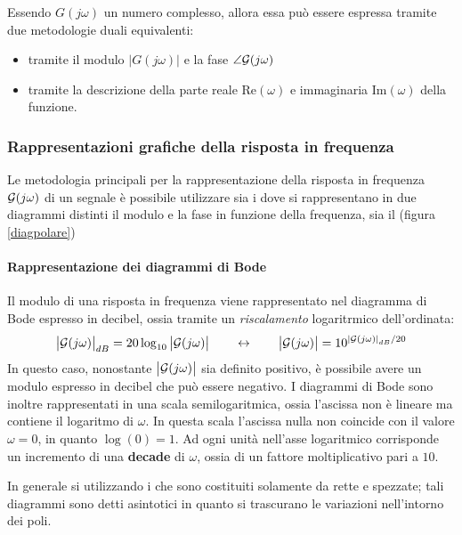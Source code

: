 		Essendo $G(j\omega)$ un numero complesso, allora essa può essere espressa tramite due metodologie duali equivalenti:
		\begin{itemize}
			\item tramite il modulo $|G(j\omega)|$ e la fase $\angle \mathcal G(j\omega)$ 
			\item tramite la descrizione della parte reale $\textrm{Re}(\omega)$ e immaginaria $\textrm{Im}(\omega)$ della funzione.
		\end{itemize}
	
		\subsubsection{Rappresentazioni grafiche della risposta in frequenza}
			Le metodologia principali per la rappresentazione della risposta in frequenza $\mathcal G(j\omega)$ di un segnale è possibile utilizzare sia i  dove si rappresentano in due diagrammi distinti il modulo e la fase in funzione della frequenza, sia il  (figura \ref{diagpolare})
			
			
			\paragraph{Rappresentazione dei diagrammi di Bode} Il modulo di una risposta in frequenza viene rappresentato nel diagramma di Bode espresso in decibel, ossia tramite un \textit{riscalamento} logaritrmico dell'ordinata:
			\[ \big| \mathcal G(j\omega) \big|_{dB} = 20 \log_{10}\big| \mathcal G(j\omega) \big| \qquad \leftrightarrow \qquad \big| \mathcal G(j\omega) \big| = 10^{\left| \mathcal G(j\omega) \right|_{dB} / 20 }\]
			In questo caso, nonostante $\big| \mathcal G(j\omega) \big|$ sia definito positivo, è possibile avere un modulo espresso in decibel che può essere negativo. I diagrammi di Bode sono inoltre rappresentati in una scala semilogaritmica, ossia l'ascissa non è lineare ma contiene il logaritmo di $\omega$. In questa scala l'ascissa nulla non coincide con il valore $\omega= 0$, in quanto $\log(0) = 1$. Ad ogni unità nell'asse logaritmico corrisponde un incremento di una \textbf{decade} di $\omega$, ossia di un fattore moltiplicativo pari a $10$.
			
			In generale si utilizzando i  che sono costituiti solamente da rette e spezzate; tali diagrammi sono detti asintotici in quanto si trascurano le variazioni nell'intorno dei poli.
			
